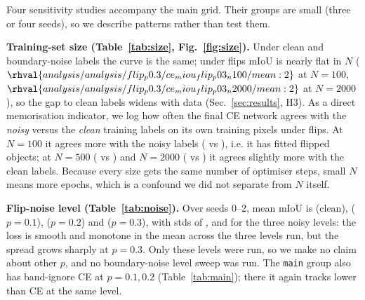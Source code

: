 Four sensitivity studies accompany the main grid. Their groups are small (three or four seeds), so we describe patterns rather than test them.

\begin{table}[t]\centering\caption{Training-set size: CE test IoU (mean $\pm$ std, $n$ seeds), all tasks and sizes run.}\label{tab:size}
\resizebox{\columnwidth}{!}{}\end{table}

\textbf{Training-set size (Table~\ref{tab:size}, Fig.~\ref{fig:size}).} Under clean and boundary-noise labels the curve is the same; under flips mIoU is nearly flat in $N$ ($\rhval{analysis/analysis/flip_p0.3/ce_miou_flip_p03_n100/mean:2}$ at $N=100$, $\rhval{analysis/analysis/flip_p0.3/ce_miou_flip_p03_n2000/mean:2}$ at $N=2000$), so the gap to clean labels widens with data (Sec.~\ref{sec:results}, H3). As a direct memorisation indicator, we log how often the final CE network agrees with the \emph{noisy} versus the \emph{clean} training labels on its own training pixels under flips. At $N=100$ it agrees more with the noisy labels ( vs ), i.e. it has fitted flipped objects; at $N=500$ ( vs ) and $N=2000$ ( vs ) it agrees slightly more with the clean labels. Because every size gets the same number of optimiser steps, small $N$ means more epochs, which is a confound we did not separate from $N$ itself.

\begin{table}[t]\centering\caption{Noise level, CE, flip noise, $N=500$ (three seeds; clean and $p=0.3$ over the same three seeds).}\label{tab:noise}
\resizebox{\columnwidth}{!}{}\end{table}

\textbf{Flip-noise level (Table~\ref{tab:noise}).} Over seeds 0--2, mean mIoU is  (clean),  ($p=0.1$),  ($p=0.2$) and  ($p=0.3$), with stds of ,  and  for the three noisy levels: the loss is smooth and monotone in the mean across the three levels run, but the spread grows sharply at $p=0.3$. Only these levels were run, so we make no claim about other $p$, and no boundary-noise level sweep was run. The \texttt{main} group also has band-ignore CE at $p=0.1,0.2$ (Table~\ref{tab:main}); there it again tracks lower than CE at the same level.


